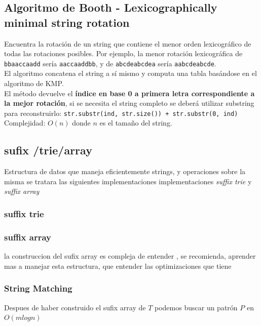 \documentclass[10pt,letterpaper]{article}
\newcommand{\source}[1]{
  
  \dotfill
}
\begin{document}
  \subsection{Algoritmo de Booth - Lexicographically minimal string rotation}
    Encuentra la rotación de un string que contiene el menor orden lexicográfico de todas las rotaciones posibles. Por ejemplo, la menor rotación lexicográfica de \texttt{bbaaccaadd} sería \texttt{aaccaaddbb}, y de \texttt{abcdeabcdea} sería \texttt{aabcdeabcde}. \\
    El algoritmo concatena el string a sí mismo y computa una tabla basándose en el algoritmo de KMP.\\
    El método devuelve el \textbf{índice en base 0 a primera letra correspondiente a la mejor rotación}, si se necesita el string completo se deberá utilizar substring para reconstruirlo: \texttt{str.substr(ind, str.size()) + str.substr(0, ind)}\\
Complejidad: $O(n)$ donde $n$ es el tamaño del string.
    \source{./src/booths.cpp}

	\subsection{sufix /trie/array}
	Estructura de datos que maneja eficientemente strings, y operaciones sobre la misma
	se tratara las siguientes implementaciones implementaciones  \textit{suffix trie} y \textit{suffix array} 
	
	\subsubsection{suffix trie}
	\source{./src/sufix-Array-Trie/sufixTrie.cpp}
	
	\subsubsection{suffix array}
	la construccion del sufix array es compleja de entender , se recomienda, aprender mas a manejar esta estructura, que entender las optimizaciones que tiene 
	\source{./src/sufix-Array-Trie/sufixArray.cpp}
	
	\subsubsection{String Matching}
	Despues de haber construido el sufix array de $T$ podemos buscar un patrón $P$ en $O(mlogn)$
	\source{./src/sufix-Array-Trie/SufixArrayStringMatching.cpp}
	
\end{document}
